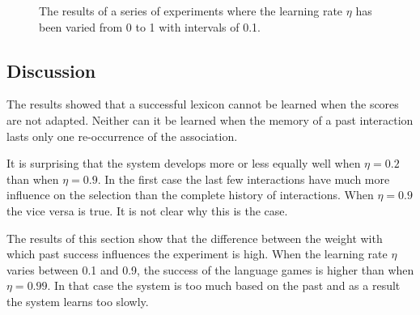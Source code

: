 \begin{figure}[p]
	\caption{The results of a series of experiments where the learning rate $\eta$ has been varied from 0 to 1 with intervals of 0.1.}
	\label{f:lex:A}
\end{figure}
\clearpage

\subsection{Discussion}

The results showed that a successful lexicon cannot be learned when the scores are not adapted. Neither can it be learned when the memory of a past interaction lasts only one re-occurrence of the association.

It is surprising that the system develops more or less equally well when $\eta=0.2$ than when $\eta=0.9$. In the first case the last few interactions have much more influence on the selection than the complete history of interactions. When $\eta=0.9$ the vice versa is true. It is not clear why this is the case.


The results of this section show that the difference between the weight with which past success influences the experiment is high. When the learning rate $\eta$ varies between 0.1 and 0.9, the success of the language games is higher than when $\eta=0.99$. In that case the system is too much based on the past and as a result the system learns too slowly.

